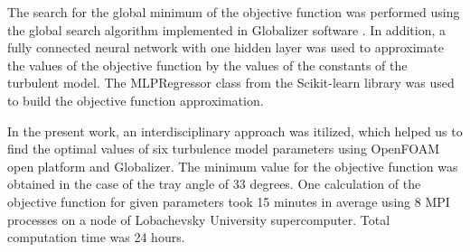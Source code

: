 \documentclass[sensors,article,submit,moreauthors,pdftex]{Definitions/mdpi}
\begin{document}
\begin{paracol}{2}
The search for the global minimum of the objective function was performed using the global search algorithm implemented in Globalizer software \cite{globalizerSystem}. In addition, a fully connected neural network with one hidden layer was used to approximate the values of the objective function by the values of the constants of the turbulent model. The MLPRegressor class from the Scikit-learn library was used to build the objective function approximation. 

In the present work, an interdisciplinary approach was itilized, which helped us to find the optimal values of six turbulence model parameters using OpenFOAM open platform and Globalizer. The minimum value for the objective function was obtained in the case of the tray angle of 33 degrees. One calculation of the objective function for given parameters took 15 minutes in average using 8 MPI processes on a node of Lobachevsky University supercomputer. Total computation time was 24 hours.  




%

\vspace{6pt} 





\end{paracol}
\end{document}
